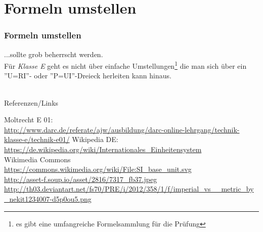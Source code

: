 \section{Formeln umstellen}

\begin{frame}
    \frametitle{Formeln umstellen}

    ...sollte grob beherrscht werden. \\[2em]
    
    Für \emph{Klasse E} geht es nicht über einfache Umstellungen\footnote{es
    gibt eine umfangreiche Formelsammlung für die Prüfung} die man sich über ein
    ''U=RI''- oder ''P=UI''-Dreieck herleiten kann hinaus.


\end{frame}

\renewcommand{\refname}{Referenzen}

\hypertarget{refs}{}
\textcolor{white}{} \\ %
\Large Referenzen/Links
\footnotesize

\begin{thebibliography}{}
     Moltrecht E 01: \\
                    \url{http://www.darc.de/referate/ajw/ausbildung/darc-online-lehrgang/technik-klasse-e/technik-e01/}
        Wikipedia DE: \\
                    \url{https://de.wikipedia.org/wiki/Internationales_Einheitensystem}\\
        Wikimedia Commons \\
                    \url{https://commons.wikimedia.org/wiki/File:SI_base_unit.svg}\\
      \url{http://asset-f.soup.io/asset/2816/7317_fb37.jpeg}
      \url{http://th03.deviantart.net/fs70/PRE/i/2012/358/1/f/imperial_vs__metric_by_nekit1234007-d5p0ou5.png}
\end{thebibliography} 



